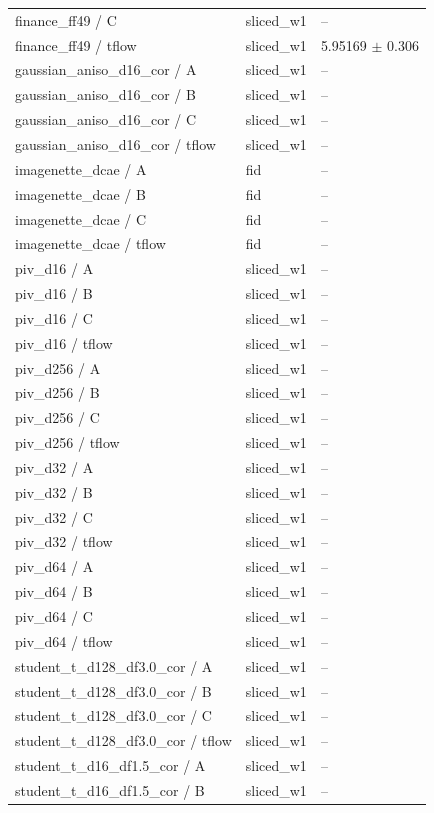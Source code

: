 \begin{tabular}{lll}
finance\_ff49 / C & sliced\_w1 & -- \\
finance\_ff49 / tflow & sliced\_w1 & 5.95169 $\pm$ 0.306 \\
gaussian\_aniso\_d16\_cor / A & sliced\_w1 & -- \\
gaussian\_aniso\_d16\_cor / B & sliced\_w1 & -- \\
gaussian\_aniso\_d16\_cor / C & sliced\_w1 & -- \\
gaussian\_aniso\_d16\_cor / tflow & sliced\_w1 & -- \\
imagenette\_dcae / A & fid & -- \\
imagenette\_dcae / B & fid & -- \\
imagenette\_dcae / C & fid & -- \\
imagenette\_dcae / tflow & fid & -- \\
piv\_d16 / A & sliced\_w1 & -- \\
piv\_d16 / B & sliced\_w1 & -- \\
piv\_d16 / C & sliced\_w1 & -- \\
piv\_d16 / tflow & sliced\_w1 & -- \\
piv\_d256 / A & sliced\_w1 & -- \\
piv\_d256 / B & sliced\_w1 & -- \\
piv\_d256 / C & sliced\_w1 & -- \\
piv\_d256 / tflow & sliced\_w1 & -- \\
piv\_d32 / A & sliced\_w1 & -- \\
piv\_d32 / B & sliced\_w1 & -- \\
piv\_d32 / C & sliced\_w1 & -- \\
piv\_d32 / tflow & sliced\_w1 & -- \\
piv\_d64 / A & sliced\_w1 & -- \\
piv\_d64 / B & sliced\_w1 & -- \\
piv\_d64 / C & sliced\_w1 & -- \\
piv\_d64 / tflow & sliced\_w1 & -- \\
student\_t\_d128\_df3.0\_cor / A & sliced\_w1 & -- \\
student\_t\_d128\_df3.0\_cor / B & sliced\_w1 & -- \\
student\_t\_d128\_df3.0\_cor / C & sliced\_w1 & -- \\
student\_t\_d128\_df3.0\_cor / tflow & sliced\_w1 & -- \\
student\_t\_d16\_df1.5\_cor / A & sliced\_w1 & -- \\
student\_t\_d16\_df1.5\_cor / B & sliced\_w1 & -- \\

\end{tabular}
